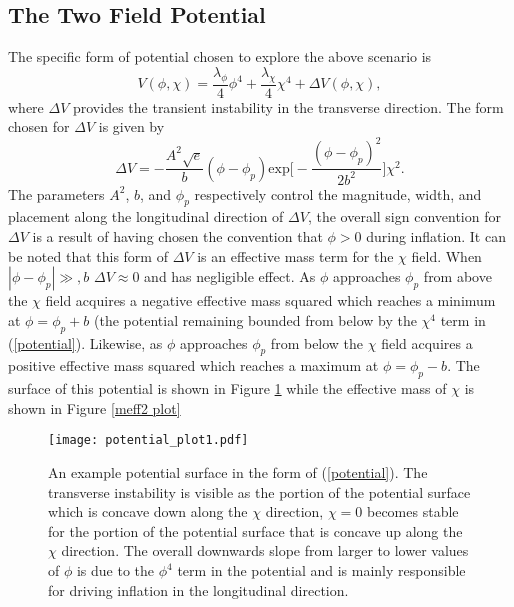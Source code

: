 \documentclass[letterpaper,11pt]{article}
\begin{document}

\subsection{The Two Field Potential}
The specific form of potential chosen to explore the above scenario is
\begin{equation}
V(\phi, \chi) = \frac{\lambda_{\phi}}{4}\phi^4 + \frac{\lambda_{\chi}}{4}\chi^4 + \Delta V(\phi, \chi), \label{potential}
\end{equation}
where $\Delta V$ provides the transient instability in the transverse direction. The form chosen for $\Delta V$ is given by
\begin{equation}
\Delta V = -\frac{A^2\sqrt{e}}{b}(\phi - \phi_p)\mathrm{exp}\bigg[-\frac{(\phi-\phi_p)^2}{2b^2}\bigg]\chi^2. \label{dv}
\end{equation}
The parameters $A^2$, $b$, and $\phi_p$ respectively control the magnitude, width, and placement along the longitudinal direction of $\Delta V$, the overall sign convention for $\Delta V$ is a result of having chosen the convention that $\phi>0$ during inflation. It can be noted that this form of $\Delta V$ is an effective mass term for the $\chi$ field. When $|\phi-\phi_p| \gg, b$ $\Delta V \approx 0$ and has negligible effect. As $\phi$ approaches $\phi_p$ from above the $\chi$ field acquires a negative effective mass squared which reaches a minimum at $\phi = \phi_p + b$ (the potential remaining bounded from below by the $\chi^4$ term in (\ref{potential}). Likewise, as $\phi$ approaches $\phi_p$ from below the $\chi$ field acquires a positive effective mass squared which reaches a maximum at $\phi = \phi_p - b$. The surface of this potential is shown in Figure \ref{potential plot} while the effective mass of $\chi$ is shown in Figure \ref{meff2 plot}

\begin{figure}
\begin{center}
\texttt{[image: potential\_plot1.pdf]}
\caption{An example potential surface in the form of (\ref{potential}). The transverse instability is visible as the portion of the potential surface which is concave down along the $\chi$ direction, $\chi=0$ becomes stable for the portion of the potential surface that is concave up along the $\chi$ direction. The overall downwards slope from larger to lower values of $\phi$ is due to the $\phi^4$ term in the potential and is mainly responsible for driving inflation in the longitudinal direction.}
\label{potential plot}
\end{center}
\end{figure}
\end{document}

